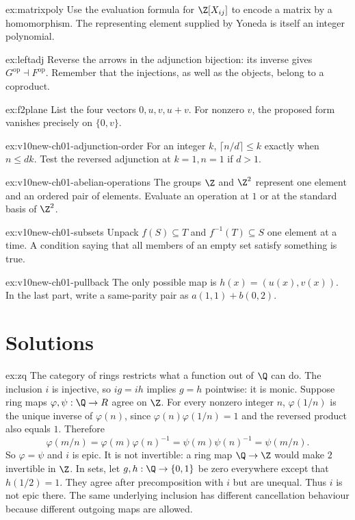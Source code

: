 \begin{hint}{ex:matrixpoly}
Use the evaluation formula for $\Z[X_{ij}]$ to encode a matrix by a homomorphism. The representing element supplied by Yoneda is itself an integer polynomial.
\end{hint}

\begin{hint}{ex:leftadj}
Reverse the arrows in the adjunction bijection: its inverse gives $G^{\mathrm{op}}\dashv F^{\mathrm{op}}$. Remember that the injections, as well as the objects, belong to a coproduct.
\end{hint}

\begin{hint}{ex:f2plane}
List the four vectors $0,u,v,u+v$. For nonzero $v$, the proposed form vanishes precisely on $\{0,v\}$.
\end{hint}

\begin{hint}{ex:v10new-ch01-adjunction-order}
For an integer $k$, $\lceil n/d\rceil\le k$ exactly when $n\le dk$. Test the reversed adjunction at $k=1,n=1$ if $d>1$.
\end{hint}

\begin{hint}{ex:v10new-ch01-abelian-operations}
The groups $\Z$ and $\Z^2$ represent one element and an ordered pair of elements. Evaluate an operation at $1$ or at the standard basis of $\Z^2$.
\end{hint}

\begin{hint}{ex:v10new-ch01-subsets}
Unpack $f(S)\subseteq T$ and $f^{-1}(T)\subseteq S$ one element at a time. A condition saying that all members of an empty set satisfy something is true.
\end{hint}

\begin{hint}{ex:v10new-ch01-pullback}
The only possible map is $h(x)=(u(x),v(x))$. In the last part, write a same-parity pair as $a(1,1)+b(0,2)$.
\end{hint}

\section{Solutions}

\begin{solution}{ex:zq}
\idea The category of rings restricts what a function out of $\Q$ can do.
\writeup The inclusion $i$ is injective, so $ig=ih$ implies $g=h$ pointwise: it is monic. Suppose ring maps $\varphi,\psi:\Q\to R$ agree on $\Z$. For every nonzero integer $n$, $\varphi(1/n)$ is the unique inverse of $\varphi(n)$, since $\varphi(n)\varphi(1/n)=1$ and the reversed product also equals $1$. Therefore
\[
\varphi(m/n)=\varphi(m)\varphi(n)^{-1}
 =\psi(m)\psi(n)^{-1}=\psi(m/n).
\]
So $\varphi=\psi$ and $i$ is epic. It is not invertible: a ring map $\Q\to\Z$ would make $2$ invertible in $\Z$. In sets, let $g,h:\Q\to\{0,1\}$ be zero everywhere except that $h(1/2)=1$. They agree after precomposition with $i$ but are unequal. Thus $i$ is not epic there. The same underlying inclusion has different cancellation behaviour because different outgoing maps are allowed.
\end{solution}

